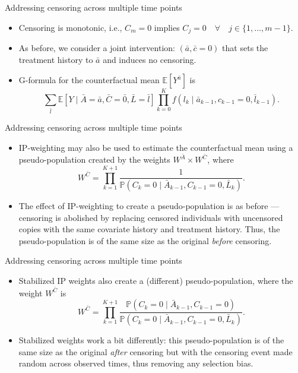\documentclass[ignorenonframetext,]{beamer}
\providecommand{\tightlist}{%
  \setlength{\itemsep}{0pt}\setlength{\parskip}{0pt}}
\newcommand{\E}{\mathbb{E}}
\newcommand{\pr}{\mathbb{P}}
\begin{document}
\begin{frame}{Addressing censoring across multiple time points}
\protect\hypertarget{addressing-censoring-across-multiple-time-points}{}

\begin{itemize}[<+->]
\tightlist
\item
  Censoring is monotonic, i.e., \(C_m = 0\) implies
  \(C_j = 0 \quad \forall \quad j \in \{1, \ldots, m-1\}\).
\item
  As before, we consider a joint intervention:
  \((\bar{a}, \bar{c} = 0)\) that sets the treatment history to
  \(\bar{a}\) and induces no censoring.
\item
  G-formula for the counterfactual mean \(\E[Y^{\bar{a}}]\) is
  \[\sum_{\bar{l}} \E[Y \mid \bar{A} = \bar{a}, \bar{C} = \bar{0}, \bar{L} =
  \bar{l}] \prod_{k=0}^K f(l_k \mid \bar{a}_{k-1}, c_{k-1} = 0,
  \bar{l}_{k-1}).\]
\end{itemize}

\end{frame}

\begin{frame}{Addressing censoring across multiple time points}
\protect\hypertarget{addressing-censoring-across-multiple-time-points-1}{}

\begin{itemize}[<+->]
\tightlist
\item
  IP-weighting may also be used to estimate the counterfactual mean
  using a pseudo-population created by the weights
  \(W^{\bar{A}} \times W^{\bar{C}}\), where
  \[W^{\bar{C}} = \prod_{k=1}^{K+1} \frac{1}{\pr(C_k = 0 \mid
  \bar{A}_{k-1}, C_{k-1} = 0, \bar{L}_k)}.\]
\item
  The effect of IP-weighting to create a pseudo-population is as before
  --- censoring is abolished by replacing censored individuals with
  uncensored copies with the same covariate history and treatment
  history. Thus, the pseudo-population is of the same size as the
  original \emph{before} censoring.
\end{itemize}

\end{frame}

\begin{frame}{Addressing censoring across multiple time points}
\protect\hypertarget{addressing-censoring-across-multiple-time-points-2}{}

\begin{itemize}[<+->]
\tightlist
\item
  Stabilized IP weights also create a (different) pseudo-population,
  where the weight \(W^{\bar{C}}\) is \[W^{\bar{C}} = \prod_{k=1}^{K+1}
  \frac{\pr(C_k = 0 \mid \bar{A}_{k-1}, C_{k-1} = 0)}
  {\pr(C_k = 0 \mid \bar{A}_{k-1}, C_{k-1} = 0, \bar{L}_k)}.\]
\item
  Stabilized weights work a bit differently: this pseudo-population is
  of the same size as the original \emph{after} censoring but with the
  censoring event made random across observed times, thus removing any
  selection bias.
\end{itemize}

\end{frame}
\end{document}
